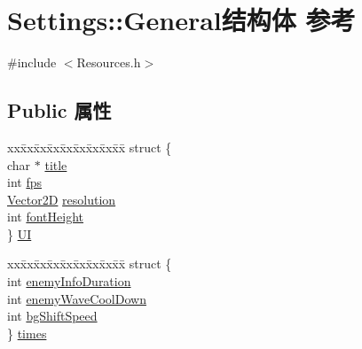 \hypertarget{struct_settings_1_1_general}{}\section{Settings\+:\+:General结构体 参考}
\label{struct_settings_1_1_general}


{\ttfamily \#include $<$Resources.\+h$>$}

\subsection*{Public 属性}
\begin{DoxyCompactItemize}
\item 
\begin{tabbing}
xx\=xx\=xx\=xx\=xx\=xx\=xx\=xx\=xx\=\kill
struct \{\\
\>char $\ast$ \hyperlink{struct_settings_1_1_general_acb5598e7641429cde268ecd8f80c4da0}{title}\\
\>int \hyperlink{struct_settings_1_1_general_a5ebbaffe3220c3daf7ef79c4cd7f1ad6}{fps}\\
\>\hyperlink{_vector2_d_8hpp_aa1f1145650f1dd9bddf7335ec6434d7c}{Vector2D} \hyperlink{struct_settings_1_1_general_a4cdcf50e69a10db0e410db97bd547d38}{resolution}\\
\>int \hyperlink{struct_settings_1_1_general_ad459481ace3b01e1d80a7548325d28d2}{fontHeight}\\
\} \hyperlink{struct_settings_1_1_general_a414f100b330453215b514ec726a9fac9}{UI}\\

\end{tabbing}\item 
\begin{tabbing}
xx\=xx\=xx\=xx\=xx\=xx\=xx\=xx\=xx\=\kill
struct \{\\
\>int \hyperlink{struct_settings_1_1_general_a48c8c522f1359b0e60c08404ac84b481}{enemyInfoDuration}\\
\>int \hyperlink{struct_settings_1_1_general_a309cc676568d698298f225d2755141f9}{enemyWaveCoolDown}\\
\>int \hyperlink{struct_settings_1_1_general_ae17ce428cf02b7c52530c8752ebca9cd}{bgShiftSpeed}\\
\} \hyperlink{struct_settings_1_1_general_ae31b262693f15e6ab5ea1e1c609249b9}{times}\\

\end{tabbing}\end{DoxyCompactItemize}


